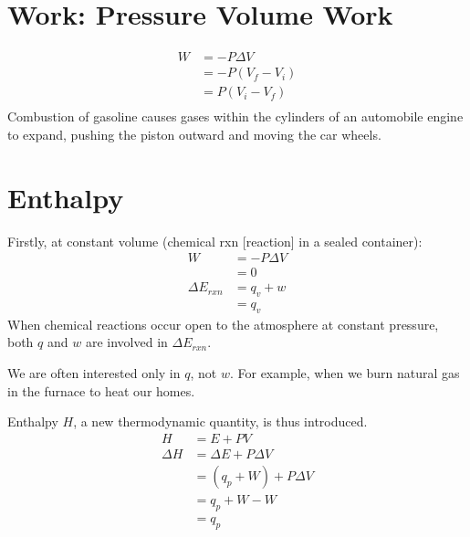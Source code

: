 \documentclass[
	chapter=6,
	title={Thermochemistry},
	showanswers=true,
]{chem122notes}
\begin{document}
\section{Work: Pressure Volume Work}\label{sec:work:-pressure-volume-work}
\begin{equation}
	\begin{aligned}
		W &= -P\Delta V\\
		  &= -P(V_{f} - V_{i})\\
		  &= P(V_{i} - V_{f})\\
	\end{aligned}
	\label{eq:pressue-volume-work}
\end{equation}
Combustion of gasoline causes gases within the cylinders of an automobile engine to expand, pushing the piston outward and moving the car wheels.

\section{Enthalpy}\label{sec:enthalpy}

Firstly, at constant volume (chemical rxn [reaction] in a sealed container):
\begin{equation*}
\begin{aligned}
	W &= -P\Delta V\\
	  &= 0\\
	\Delta E_{rxn} &= q_{v} + w\\
						 &= q_{v}
\end{aligned}
\end{equation*}
When chemical reactions occur open to the atmosphere at constant pressure, both $q$ and $w$ are involved in $\Delta E_{rxn}$.

We are often interested only in $q$, not $w$.
For example, when we burn natural gas in the furnace to heat our homes.

Enthalpy $H$, a new thermodynamic quantity, is thus introduced.
\begin{equation}
	\begin{aligned}
		H &= E + PV\\
		\Delta H &= \Delta E + P\Delta V\\
		&= (q_{p} + W) + P\Delta V\\
		&= q_{p} + W - W\\
		&= q_{p}
	\end{aligned}
	\label{eq:enthalpy}
\end{equation}
\end{document}
